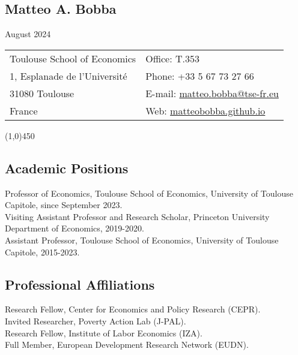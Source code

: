 \documentclass[12pt,english]{article}
\begin{document}


\noindent
\begin{center}
\section*{Matteo A. Bobba} \vspace{-0.3cm}
August 2024
\end{center} 
\begin{tabular}{p{9cm}p{9cm}}
Toulouse School of Economics &  Office: T.353  \\ 
1, Esplanade de l'Universit\'{e} & Phone: +33 5 67 73 27 66\\
31080 Toulouse  &  E-mail: \href{mailto: matteo.bobba@tse-fr.eu}{matteo.bobba@tse-fr.eu} \\
France & Web: \href{https://matteobobba.github.io/}{matteobobba.github.io}  \\
\end{tabular}
\vspace{-0.1cm}
\line(1,0){450} \\
\vspace{-0.3cm}

\subsection*{Academic Positions}
Professor of Economics, Toulouse School of Economics, University of Toulouse Capitole, since September 2023. \vspace{0.2cm} \\ 
Visiting Assistant Professor and Research Scholar, Princeton University Department of Economics, 2019-2020. \vspace{0.2cm} \\
Assistant Professor, Toulouse School of Economics, University of Toulouse Capitole, 2015-2023. 

\subsection*{Professional Affiliations}
Research Fellow, Center for Economics and Policy Research (CEPR).\vspace{0.2cm} \\
Invited Researcher, Poverty Action Lab (J-PAL). \vspace{0.2cm} \\ 
Research Fellow, Institute of Labor Economics (IZA). \vspace{0.2cm} \\ 
Full Member, European Development Research Network (EUDN).
\end{document}
